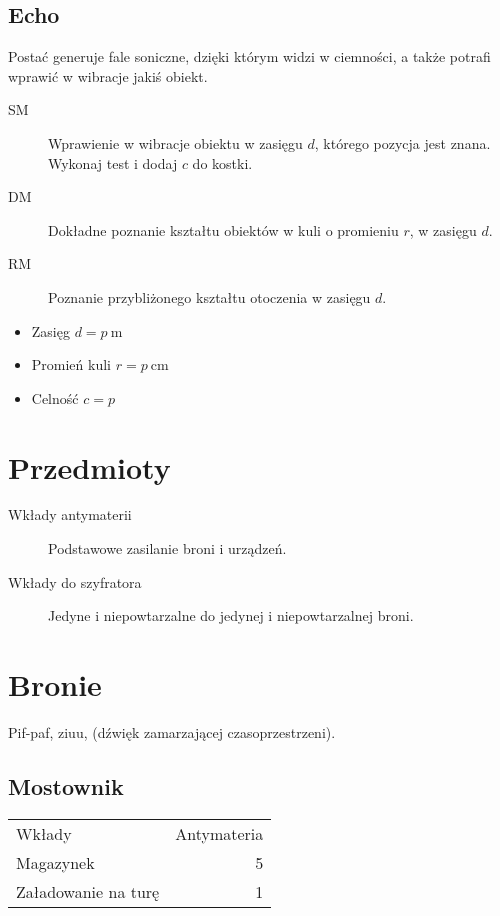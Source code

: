 \subsection{Echo}
Postać generuje fale soniczne, dzięki którym widzi w ciemności, a także potrafi wprawić w wibracje jakiś obiekt.
\begin{description}
	\item[SM] Wprawienie w wibracje obiektu w zasięgu $d$, którego pozycja jest znana. Wykonaj test \aba{} i dodaj $c$ do kostki.
	\item[DM] Dokładne poznanie kształtu obiektów w kuli o promieniu $r$, w zasięgu $d$.
	\item[RM] Poznanie przybliżonego kształtu otoczenia w zasięgu $d$.
\end{description}
\begin{itemize}
	\item Zasięg $d = p \ \si{\meter}$
	\item Promień kuli $r = p \ \si{\centi\meter}$
	\item Celność $c = p$
\end{itemize}


\section{Przedmioty}
\begin{description}
	\item[Wkłady antymaterii] Podstawowe zasilanie broni i urządzeń.
	\item[Wkłady do szyfratora] Jedyne i niepowtarzalne do jedynej i niepowtarzalnej broni.
\end{description}

\section{Bronie}
Pif-paf, ziuu, (dźwięk zamarzającej czasoprzestrzeni).
\subsection{Mostownik \abs{}}

\begin{tabular}{lr}
Wkłady & Antymateria \\
Magazynek & 5 \\
Załadowanie na turę & 1 \\
\end{tabular}

